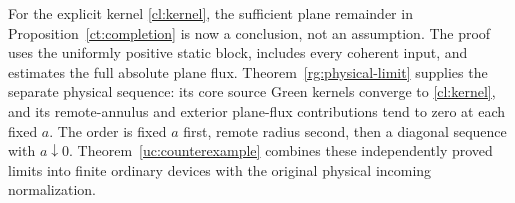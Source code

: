 \begin{remark}
\label{cl:scope}
For the explicit kernel \eqref{cl:kernel}, the sufficient plane
remainder in Proposition~\ref{ct:completion} is now a conclusion,
not an assumption. The proof uses the uniformly positive static
block, includes every coherent input, and estimates the full
absolute plane flux. Theorem~\ref{rg:physical-limit} supplies the
separate physical sequence: its core source Green kernels converge
to \eqref{cl:kernel}, and its remote-annulus and exterior plane-flux
contributions tend to zero at each fixed $a$.
The order is fixed $a$ first, remote radius second, then a diagonal
sequence with $a\downarrow0$. Theorem~\ref{uc:counterexample}
combines these independently proved limits into finite ordinary
devices with the original physical incoming normalization.
\end{remark}
